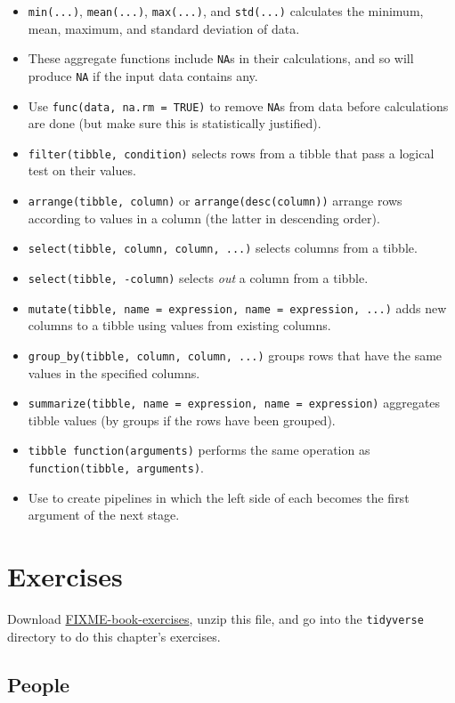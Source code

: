 \begin{itemize}
\item
  \texttt{min(...)}, \texttt{mean(...)}, \texttt{max(...)}, and \texttt{std(...)} calculates the minimum, mean, maximum, and standard deviation of data.
\item
  These aggregate functions include \texttt{NA}s in their calculations, and so will produce \texttt{NA} if the input data contains any.
\item
  Use \texttt{func(data, na.rm = TRUE)} to remove \texttt{NA}s from data before calculations are done (but make sure this is statistically justified).
\item
  \texttt{filter(tibble, condition)} selects rows from a tibble that pass a logical test on their values.
\item
  \texttt{arrange(tibble, column)} or \texttt{arrange(desc(column))} arrange rows according to values in a column (the latter in descending order).
\item
  \texttt{select(tibble, column, column, ...)} selects columns from a tibble.
\item
  \texttt{select(tibble, -column)} selects \emph{out} a column from a tibble.
\item
  \texttt{mutate(tibble, name = expression, name = expression, ...)} adds new columns to a tibble using values from existing columns.
\item
  \texttt{group\_by(tibble, column, column, ...)} groups rows that have the same values in the specified columns.
\item
  \texttt{summarize(tibble, name = expression, name = expression)} aggregates tibble values (by groups if the rows have been grouped).
\item
  \texttt{tibble {\pipe} function(arguments)} performs the same operation as \texttt{function(tibble, arguments)}.
\item
  Use \texttt{\pipe} to create pipelines in which the left side of each \texttt{\pipe} becomes the first argument of the next stage.
\end{itemize}

\section{Exercises}

Download \url{FIXME-book-exercises},
unzip this file,
and go into the \texttt{tidyverse} directory to do this chapter's exercises.

\subsection*{People}

